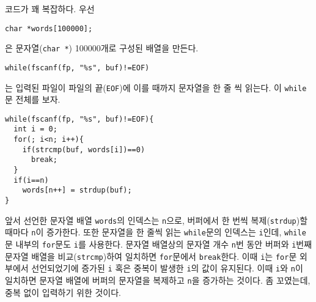 \documentclass[a4paper,chapter,atbegshi]{oblivoir}
\begin{document}
코드가 꽤 복잡하다. 우선 
\begin{lstlisting}[style=C]
char *words[100000];
\end{lstlisting}
은 문자열(\texttt{char *}) 100000개로 구성된 배열을 만든다. 
\begin{lstlisting}[style=C]
while(fscanf(fp, "%s", buf)!=EOF)
\end{lstlisting}
는 입력된 파일이 파일의 끝(\texttt{EOF})에 이를 때까지 문자열을 한 줄 씩 읽는다.
이 \texttt{while}문 전체를 보자.
\begin{lstlisting}[style=C]
while(fscanf(fp, "%s", buf)!=EOF){
  int i = 0;
  for(; i<n; i++){
    if(strcmp(buf, words[i])==0)
      break;
  }
  if(i==n)
    words[n++] = strdup(buf);
}
\end{lstlisting}
앞서 선언한 문자열 배열 \texttt{words}의 인덱스는 \texttt{n}으로, 버퍼에서
한 번씩 복제(\texttt{strdup})할 때마다 \texttt{n}이 증가한다. 
또한 문자열을 한 줄씩 읽는 \texttt{while}문의 인덱스는 \texttt{i}인데,
\texttt{while}문 내부의 \texttt{for}문도 \texttt{i}를 사용한다.
문자열 배열상의 문자열 개수 \texttt{n}번 동안 버퍼와 \texttt{i}번째
문자열 배열을 비교(\texttt{strcmp})하여 일치하면 \texttt{for}문에서
\texttt{break}한다. 이때 \texttt{i}는 \texttt{for}문 외부에서
선언되었기에 증가된 \texttt{i} 혹은 중복이 발생한 \texttt{i}의 값이 유지된다.
이때 \texttt{i}와 \texttt{n}이 일치하면 문자열 배열에 버퍼의 문자열을
복제하고 \texttt{n}을 증가하는 것이다. 좀 꼬였는데, 중복 없이
입력하기 위한 것이다.
\end{document}
